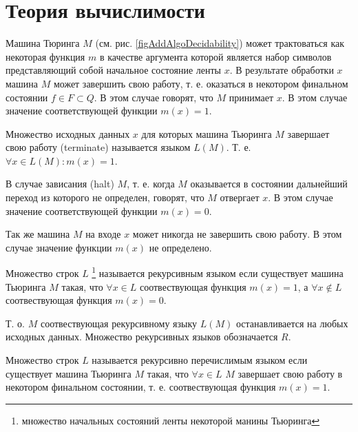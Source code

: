 \section{Теория вычислимости}

Машина Тюринга $M$ (см. рис. \ref{figAddAlgoDecidability}) может
трактоваться как некоторая функция $m$ в качестве 
аргумента которой является набор символов представляющий собой
начальное состояние ленты $x$. В результате обработки $x$ машина $M$
может завершить свою работу, т. е. оказаться в некотором финальном
состоянии $f \in F \subset Q$. В этом случае говорят, что $M$
принимает $x$. В этом случае значение соответствующей функции 
$m(x) = 1$. 

\begin{definition}
Множество исходных данных $x$ для которых машина Тьюринга $M$ завершает
свою работу (terminate) называется языком $L\left(M\right)$. Т. е.  
$\forall x \in L\left(M\right): m(x) = 1$.
\end{definition}

В случае зависания (halt) $M$, т. е. когда $M$
оказывается в состоянии дальнейший переход из которого не определен,
говорят, что $M$ отвергает $x$. В этом случае значение соответствующей
функции $m(x) =0$. 

Так же машина $M$ на входе $x$ может никогда не
завершить свою работу. В этом случае значение функции $m(x)$
не определено.    

\begin{definition}
Множество строк $L$
\footnote{множество начальных состояний ленты некоторой
манины Тьюринга}
называется рекурсивным языком если существует машина Тьюринга $M$
такая, что $\forall x \in L$ соотвествующая функция $m(x) = 1$, а 
$\forall x \notin L$ соотвествующая функция $m(x) = 0$. 
\end{definition}

Т. о. $M$ соотвествующая рекурсивному языку $L\left(M\right)$ 
останавливается на любых исходных данных. Множество рекурсивных языков
обозначается $R$.

\begin{definition}
Множество строк $L$
называется рекурсивно перечислимым языком если существует машина Тьюринга $M$
такая, что $\forall x \in L$ $M$ завершает свою работу в некотором
финальном состоянии, т. е. соотвествующая функция $m(x) = 1$. 
\end{definition}

